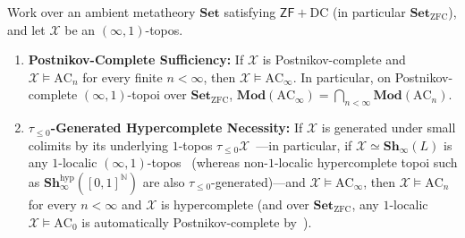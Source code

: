 \begin{theorem}\label{thm:limit-residuum}%
%

Work over an ambient metatheory $\mathbf{Set}$ satisfying $\mathsf{ZF} + \mathrm{DC}$ (in particular $\mathbf{Set}_{\mathrm{ZFC}}$), and let $\mathcal{X}$ be an $(\infty, 1)$-topos.
\begin{enumerate}
  \item \textbf{Postnikov-Complete Sufficiency:} If $\mathcal{X}$ is Postnikov-complete and $\mathcal{X} \models \mathrm{AC}_n$ for every finite $n < \infty$, then $\mathcal{X} \models \mathrm{AC}_\infty$. In particular, on Postnikov-complete $(\infty, 1)$-topoi over $\mathbf{Set}_{\mathrm{ZFC}}$, $\mathbf{Mod}(\mathrm{AC}_\infty) = \bigcap_{n < \infty} \mathbf{Mod}(\mathrm{AC}_n)$.
  \item \textbf{$\tau_{\le 0}$-Generated Hypercomplete Necessity:} If $\mathcal{X}$ is generated under small colimits by its underlying $1$-topos $\tau_{\le 0}\mathcal{X}$~\cite[Prop.~5.5.6.28]{Lurie09}---in particular, if $\mathcal{X} \simeq \mathbf{Sh}_\infty(L)$ is any $1$-localic $(\infty, 1)$-topos~\cite[\S 6.4.5]{Lurie09} (whereas non-$1$-localic hypercomplete topoi such as $\mathbf{Sh}_\infty^{\mathrm{hyp}}([0,1]^{\mathbb{N}})$ are also $\tau_{\le 0}$-generated)---and $\mathcal{X} \models \mathrm{AC}_\infty$, then $\mathcal{X} \models \mathrm{AC}_n$ for every $n < \infty$ and $\mathcal{X}$ is hypercomplete (and over $\mathbf{Set}_{\mathrm{ZFC}}$, any $1$-localic $\mathcal{X} \models \mathrm{AC}_0$ is automatically Postnikov-complete by~\cite[Corollary~7.2.1.12]{Lurie09}).
\end{enumerate}

\end{theorem}

